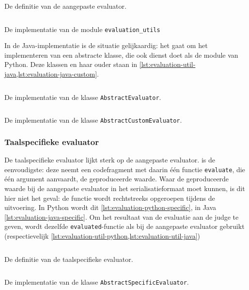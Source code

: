 \begin{listing}
    \inputminted{python}{code/custom_signature.py}
    \caption{De definitie van de aangepaste evaluator.}
    \label{lst:evaluation-python-custom}
\end{listing}

\begin{listing}
    \inputminted{python}{../../judge/runners/templates/python/evaluation_utils.py}
    \caption{De implementatie van de module \texttt{evaluation\_utils}}
    \label{lst:evaluation-util-python}
\end{listing}

In de Java-implementatie is de situatie gelijkaardig: het gaat om het implementeren van een abstracte klasse, die ook dienst doet als de module van Python.
Deze klassen en haar ouder staan in \cref{lst:evaluation-util-java,lst:evaluation-java-custom}.

\begin{listing}
    \inputminted{java}{../../judge/runners/templates/java/AbstractEvaluator.java}
    \caption{De implementatie van de klasse \texttt{AbstractEvaluator}.}
    \label{lst:evaluation-util-java}
\end{listing}

\begin{listing}
    \inputminted{java}{../../judge/runners/templates/java/AbstractCustomEvaluator.java}
    \caption{De implementatie van de klasse \texttt{AbstractCustomEvaluator}.}
    \label{lst:evaluation-java-custom}
\end{listing}

\subsubsection{Taalspecifieke evaluator}

De taalspecifieke evaluator lijkt sterk op de aangepaste evaluator.
is de eenvoudigste: deze neemt een codefragment met daarin één functie \texttt{evaluate}, die één argument aanvaardt, de geproduceerde waarde.
Waar de geproduceerde waarde bij de aangepaste evaluator in het serialisatieformaat moet kunnen, is dit hier niet het geval: de functie wordt rechtstreeks opgeroepen tijdens de uitvoering.
In Python wordt dit \cref{lst:evaluation-python-specific}, in Java \cref{lst:evaluation-java-specific}.
Om het resultaat van de evaluatie aan de judge te geven, wordt dezelfde \texttt{evaluated}-functie als bij de aangepaste evaluator gebruikt (respectievelijk \cref{lst:evaluation-util-python,lst:evaluation-util-java})

\begin{listing}
    \inputminted{python}{code/specific_signature.py}
    \caption{De definitie van de taalspecifieke evaluator.}
    \label{lst:evaluation-python-specific}
\end{listing}

\begin{listing}
    \inputminted{java}{../../judge/runners/templates/java/AbstractSpecificEvaluator.java}
    \caption{De implementatie van de klasse \texttt{AbstractSpecificEvaluator}.}
    \label{lst:evaluation-java-specific}
\end{listing}
